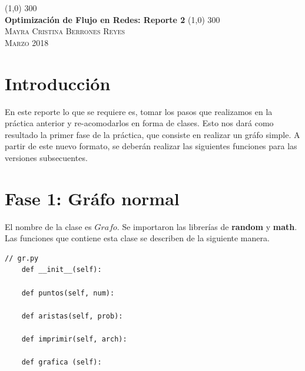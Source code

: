 \documentclass{article}%
\begin{document}
\begin{titlepage}
	\begin{center}
	\line(1,0) {300} \\
	\huge{\textbf{Optimizaci\'on de Flujo en Redes: Reporte 2 }}
	\line(1,0) {300}\\
	
	\textsc{ \Large Mayra Cristina Berrones Reyes}\\ 
	\textsc{\Large Marzo 2018} \\
	\end{center}
\end{titlepage}

\section*{Introducci\'on}

En este reporte lo que se requiere es, tomar los pasos que realizamos en la pr\'actica anterior y re-acomodarlos en forma de clases. Esto nos dar\'a como resultado la primer fase de la pr\'actica, que consiste en realizar un gr\'afo simple. A partir de este nuevo formato, se deber\'an realizar las siguientes funciones para las versiones subsecuentes.

\begin{description}[font=$\bullet$~\normalfont\scshape\color{black}]
\item[\textbf{Gr\'afo normal } ]
\item[\textbf{Gr\'afo dirigido} ]
\item[\textbf{Gr\'afo ponderado}]
\end{description}

\section*{Fase 1: Gr\'afo normal}

El nombre de la clase es $Grafo$. Se importaron las librer\'ias de \textbf{random} y \textbf{math}. Las funciones que contiene esta clase se describen de la siguiente manera.

\begin{lstlisting}
// gr.py
	def __init__(self):

	def puntos(self, num):

	def aristas(self, prob):
	
	def imprimir(self, arch):
	
	def grafica (self):
	
\end{lstlisting}
\end{document}
